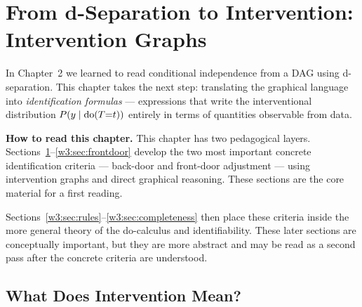 \documentclass[master.tex]{subfiles}
\begin{document}
\section{From d-Separation to Intervention: Intervention Graphs}
\label{w3:sec:mutilated}

In Chapter~2 we learned to read conditional independence from a DAG using
d-separation.  This chapter takes the next step: translating the graphical
language into \emph{identification formulas} --- expressions that write the
interventional distribution $P(y \mid \mathrm{do}(T{=}t))$ entirely in terms of
quantities observable from data.

\begin{remark}
\textbf{How to read this chapter.}
This chapter has two pedagogical layers.
Sections~\ref{w3:sec:mutilated}--\ref{w3:sec:frontdoor} develop the two
most important concrete identification criteria --- back-door and front-door
adjustment --- using intervention graphs and direct graphical reasoning.
These sections are the core material for a first reading.

Sections~\ref{w3:sec:rules}--\ref{w3:sec:completeness} then place these
criteria inside the more general theory of the do-calculus and
identifiability.
These later sections are conceptually important, but they are more abstract
and may be read as a second pass after the concrete criteria are understood.
\end{remark}

\subsection{What Does Intervention Mean?}
\label{w3:sec:intervention-meaning}
\end{document}
